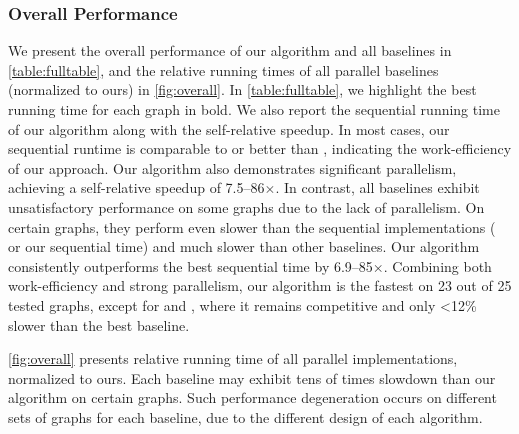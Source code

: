 \subsubsection{Overall Performance}
We present the overall performance of our algorithm and all baselines in \cref{table:fulltable}, 
and the relative running times of all parallel baselines (normalized to ours) in \cref{fig:overall}. 
In \cref{table:fulltable}, 
we highlight the best running time for each graph in bold. 
We also report the sequential running time of our algorithm along with the self-relative speedup. 
In most cases, our sequential runtime is comparable to or better than \BZ{}, 
indicating the work-efficiency of our approach.
Our algorithm also demonstrates significant parallelism, 
achieving a self-relative speedup of 7.5--86$\times$. 
In contrast,
all baselines exhibit unsatisfactory performance on some graphs due to the lack of parallelism.
On certain graphs, they perform even slower than the sequential implementations (\BZ{} or our sequential time) and much slower than other baselines. 
Our algorithm consistently outperforms the best sequential time by 6.9--85$\times$. 
Combining both work-efficiency and strong parallelism, 
our algorithm is the fastest on 23 out of 25 tested graphs, except for \EU{} and \NA{}, 
where it remains competitive and only <12\% slower than the best baseline.

\cref{fig:overall} presents relative running time of all parallel implementations, normalized to ours. 
Each baseline may exhibit tens of times slowdown than our algorithm on certain graphs. 
Such performance degeneration occurs on different sets of graphs for each baseline, due to the different design of each algorithm. 

